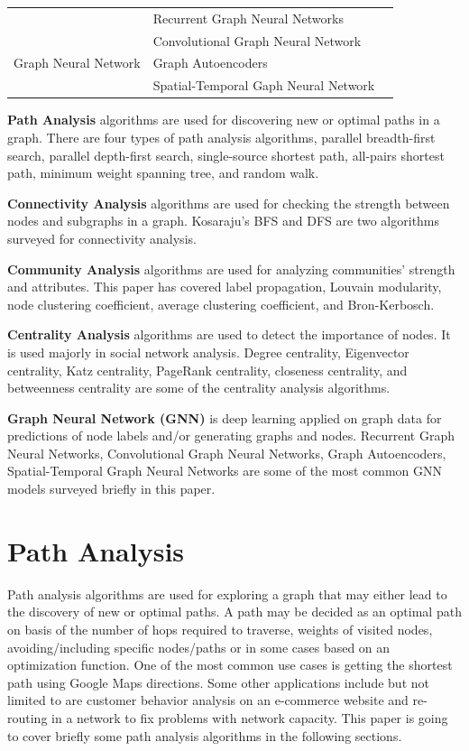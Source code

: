 \documentclass[journal,twoside,web]{ieeecolor}
\begin{document}
\begin{table}[]
\begin{tabular}{l l l}
        \multirow{2}{*}{} &  Recurrent Graph Neural Networks & \cite{33}\\ 
        \cline{2-3} 
        \multirow{2}{*}{} & Convolutional Graph Neural Network & \cite{33}\\ 
        \cline{2-3} 
        Graph Neural Network & Graph Autoencoders & \cite{33}\\
        \cline{2-3}
        \multirow{2}{*}{} & Spatial-Temporal Gaph Neural Network & \cite{33}\\  

        \bottomrule
    \end{tabular}
\end{table}

\textbf{Path Analysis} algorithms are used for discovering new or optimal paths in a graph. There are four types of path analysis algorithms, parallel breadth-first search, parallel depth-first search, single-source shortest path, all-pairs shortest path, minimum weight spanning tree, and random walk.

\textbf{Connectivity Analysis} algorithms are used for checking the strength between nodes and subgraphs in a graph. Kosaraju's BFS and DFS are two algorithms surveyed for connectivity analysis.

\textbf{Community Analysis} algorithms are used for analyzing communities' strength and attributes. This paper has covered label propagation, Louvain modularity, node clustering coefficient, average clustering coefficient, and Bron-Kerbosch.

\textbf{Centrality Analysis} algorithms are used to detect the importance of nodes. It is used majorly in social network analysis. Degree centrality, Eigenvector centrality, Katz centrality, PageRank centrality, closeness centrality, and betweenness centrality are some of the centrality analysis algorithms.

\textbf{Graph Neural Network (GNN)} is deep learning applied on graph data for predictions of node labels and/or generating graphs and nodes. Recurrent Graph Neural Networks, Convolutional Graph Neural Networks, Graph Autoencoders, Spatial-Temporal Graph Neural Networks are some of the most common GNN models surveyed briefly in this paper.  

\section{Path Analysis}
\label{sec:path}
Path analysis algorithms are used for exploring a graph that may either lead to the discovery of new or optimal paths. A path may be decided as an optimal path on basis of the number of hops required to traverse, weights of visited nodes, avoiding/including specific nodes/paths or in some cases based on an optimization function. One of the most common use cases is getting the shortest path using Google Maps directions. Some other applications include but not limited to are customer behavior analysis on an e-commerce website and re-routing in a network to fix problems with network capacity. This paper is going to cover briefly some path analysis algorithms in the following sections.
\end{document}
